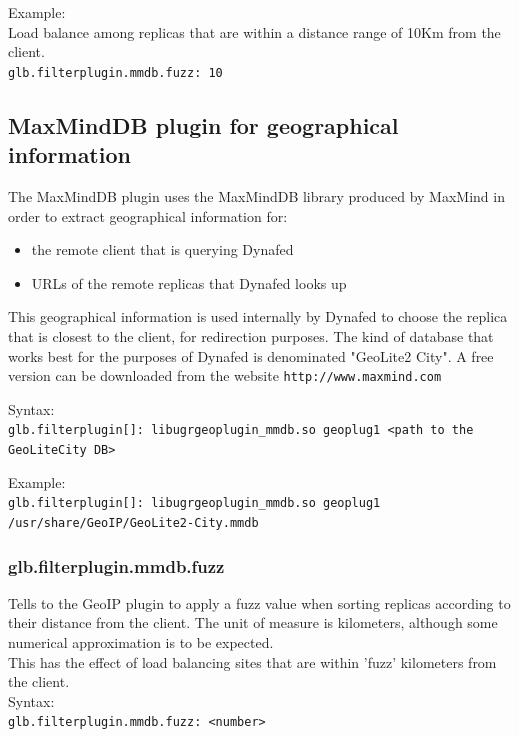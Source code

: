 \documentclass[12pt]{article} %
\begin{document}
Example:\\
Load balance among replicas that are within a distance range of 10Km from the client.\\
\lstinline"glb.filterplugin.mmdb.fuzz: 10"

\subsection{MaxMindDB plugin for geographical information}
\label{MaxMindDB}

The MaxMindDB plugin uses the MaxMindDB library produced by MaxMind \cite{geoip} in order to extract geographical information for:

\begin{itemize}
\item the remote client that is querying Dynafed
\item URLs of the remote replicas that Dynafed looks up
\end{itemize}


 This geographical information is used internally by Dynafed to choose the replica that is closest to the client, for redirection
purposes. The kind of database that works best for the purposes of Dynafed is denominated "GeoLite2 City". A free version can
be downloaded from the website \lstinline"http://www.maxmind.com"

Syntax:\\
\lstinline"glb.filterplugin[]: libugrgeoplugin_mmdb.so geoplug1 <path to the GeoLiteCity DB>"

Example:\\
\lstinline"glb.filterplugin[]: libugrgeoplugin_mmdb.so geoplug1 /usr/share/GeoIP/GeoLite2-City.mmdb"


\subsubsection{glb.filterplugin.mmdb.fuzz}
Tells to the GeoIP plugin to apply a fuzz value when sorting replicas according to their distance from the client. The unit of measure is kilometers, although some numerical approximation is to be expected.\\
This has the effect of load balancing sites that are within 'fuzz' kilometers from the client.\\


Syntax:\\
\lstinline"glb.filterplugin.mmdb.fuzz: <number>"
\\
\end{document}
